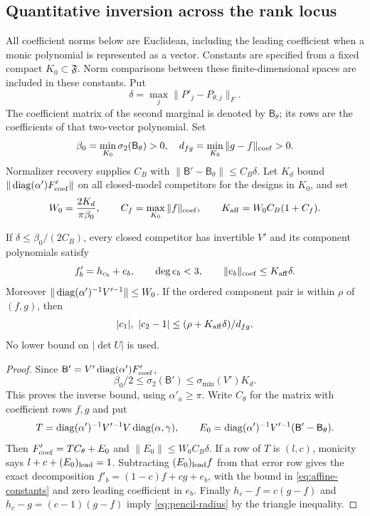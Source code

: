 \subsection{Quantitative inversion across the rank locus}
All coefficient norms below are Euclidean, including the leading
coefficient when a monic polynomial is represented as a vector. Constants
are specified from a fixed compact $K_0\subset\mathfrak F$. Norm
comparisons between these finite-dimensional spaces are included in
these constants. Put
\[
 \delta=\max_j\|P'_j-P_{\theta,j}\|_F.
\]
The coefficient matrix of the second marginal is denoted by
$\mathsf B_\theta$; its rows are the coefficients of that two-vector
polynomial. Set
\[
 \beta_0=\min_{K_0}\sigma_2(\mathsf B_\theta)>0,\quad
 d_{fg}=\min_{K_0}\|g-f\|_{\mathrm{coef}}>0.
\]
Normalizer recovery supplies $C_B$ with
$\|\mathsf B'-\mathsf B_\theta\|\le C_B\delta$.
Let $K_d$ bound $\|\operatorname{diag}(\alpha')F'_{\mathrm{coef}}\|$ on all closed-model
competitors for the designs in $K_0$, and set
\begin{equation}\label{eq:affine-constants}
 W_0=\frac{2K_d}{\pi\beta_0},\qquad
 C_f=\max_{K_0}\|f\|_{\mathrm{coef}},\qquad
 K_{\rm aff}=W_0C_B(1+C_f).
\end{equation}

\begin{proposition}\label{prop:affine}
If $\delta\le\beta_0/(2C_B)$, every closed competitor has invertible
$V'$ and its component polynomials satisfy
\begin{equation}\label{eq:affine-approx}
 f'_b=h_{c_b}+e_b,\qquad \deg e_b<3,\qquad
 \|e_b\|_{\mathrm{coef}}\le K_{\rm aff}\delta.
\end{equation}
Moreover $\|\operatorname{diag}(\alpha')^{-1}V'^{-1}\|\le W_0$. If the ordered
component pair is within $\rho$ of $(f,g)$, then
\begin{equation}\label{eq:pencil-radius}
 |c_1|,\ |c_2-1|\le(\rho+K_{\rm aff}\delta)/d_{fg}.
\end{equation}
No lower bound on $|\det U|$ is used.
\end{proposition}
\begin{proof}
Since $\mathsf B'=V'\operatorname{diag}(\alpha')F'_{\mathrm{coef}}$,
\[
 \beta_0/2\le\sigma_2(\mathsf B')
        \le\sigma_{\min}(V')K_d.
\]
This proves the inverse bound, using $\alpha'_a\ge\pi$.
Write $C_\theta$ for the matrix with coefficient rows $f,g$ and put
\[
 T=\operatorname{diag}(\alpha')^{-1}V'^{-1}V\operatorname{diag}(\alpha,\gamma),\qquad
 E_0=\operatorname{diag}(\alpha')^{-1}V'^{-1}(\mathsf B'-\mathsf B_\theta).
\]
Then $F'_{\mathrm{coef}}=TC_\theta+E_0$ and $\|E_0\|\le W_0C_B\delta$.
If a row of $T$ is $(l,c)$, monicity says
$l+c+(E_0)_{\rm lead}=1$. Subtracting $(E_0)_{\rm lead}f$ from
that error row gives the exact decomposition
$f'_b=(1-c)f+cg+e_b$, with the bound in
\eqref{eq:affine-constants} and zero leading coefficient in $e_b$.
Finally $h_c-f=c(g-f)$ and $h_c-g=(c-1)(g-f)$ imply
\eqref{eq:pencil-radius} by the triangle inequality.
\end{proof}

